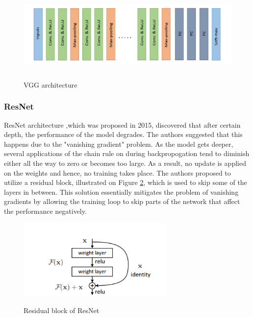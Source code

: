 \documentclass[english, 12pt, a4paper, elec, utf8, a-1b, online]{aaltothesis}
\begin{document}
\begin{figure}[htb]
	\begin{center}
		\includegraphics[height=4cm]{./vgg.png}
	\end{center}
	\caption{VGG architecture \cite{alom01}}
	\begin{center}
		\label{VGG}
	\end{center}
\end{figure}
\FloatBarrier

\subsubsection{ResNet}
ResNet architecture \cite{He2015},which was proposed in 2015, discovered that after certain depth, the performance of the model degrades. The authors suggested that this happens due to the "vanishing gradient" problem. As the model gets deeper, several applications of the chain rule on during backpropogation tend to diminish either all the way to zero or becomes too large. As a result, no update is applied on the weights and hence, no training takes place. The authors proposed to utilize a residual block, illustrated on Figure \ref{resnet}, which is used to skip some of the layers in between.  This solution essentially mitigates the problem of vanishing gradients by allowing the training loop to skip parts of the network that affect the performance negatively. 

\begin{figure}[htb]
	\begin{center}
		\includegraphics[height=4cm]{./resnet.png}
	\end{center}
	\caption{Residual block of ResNet\cite{He2015}}
	\begin{center}
		\label{resnet}
	\end{center}
\end{figure}
\FloatBarrier
\end{document}
